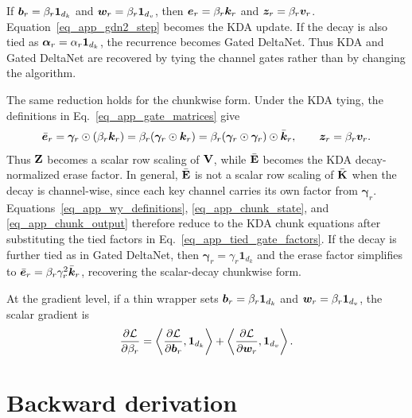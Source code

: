 If ${\bm{b}}_r=\beta_r\mathbf{1}_{d_k}$ and ${\bm{w}}_r=\beta_r\mathbf{1}_{d_v}$, then ${\bm{e}}_r=\beta_r{\bm{k}}_r$ and ${\bm{z}}_r=\beta_r{\bm{v}}_r$. Equation~\ref{eq_app_gdn2_step} becomes the KDA update. If the decay is also tied as ${\bm{\alpha}}_r=\alpha_r\mathbf{1}_{d_k}$, the recurrence becomes Gated DeltaNet. Thus KDA and Gated DeltaNet are recovered by tying the channel gates rather than by changing the algorithm.

The same reduction holds for the chunkwise form. Under the KDA tying, the definitions in Eq.~\ref{eq_app_gate_matrices} give
\begin{align}
    \bar{{\bm{e}}}_r
    =
    \boldsymbol{\gamma}_r\odot(\beta_r{\bm{k}}_r)
    =
    \beta_r(\boldsymbol{\gamma}_r\odot{\bm{k}}_r)
    =
    \beta_r(\boldsymbol{\gamma}_r\odot\boldsymbol{\gamma}_r)\odot\bar{{\bm{k}}}_r,
    \qquad
    {\bm{z}}_r
    =
    \beta_r{\bm{v}}_r .
\label{eq_app_tied_gate_factors}
\end{align}
Thus ${\mathbf{Z}}$ becomes a scalar row scaling of ${\mathbf{V}}$, while $\bar{{\mathbf{E}}}$ becomes the KDA decay-normalized erase factor. In general, $\bar{{\mathbf{E}}}$ is not a scalar row scaling of $\bar{{\mathbf{K}}}$ when the decay is channel-wise, since each key channel carries its own factor from $\boldsymbol{\gamma}_r$. Equations~\ref{eq_app_wy_definitions}, \ref{eq_app_chunk_state}, and \ref{eq_app_chunk_output} therefore reduce to the KDA chunk equations after substituting the tied factors in Eq.~\ref{eq_app_tied_gate_factors}. If the decay is further tied as in Gated DeltaNet, then $\boldsymbol{\gamma}_r=\gamma_r\mathbf{1}_{d_k}$ and the erase factor simplifies to $\bar{{\bm{e}}}_r=\beta_r\gamma_r^2\bar{{\bm{k}}}_r$, recovering the scalar-decay chunkwise form.

At the gradient level, if a thin wrapper sets ${\bm{b}}_r=\beta_r\mathbf{1}_{d_k}$ and ${\bm{w}}_r=\beta_r\mathbf{1}_{d_v}$, the scalar gradient is
\begin{align}
    \frac{\partial \mathcal{L}}{\partial \beta_r}
    =
    \left\langle
    \frac{\partial \mathcal{L}}{\partial {\bm{b}}_r},
    \mathbf{1}_{d_k}
    \right\rangle
    +
    \left\langle
    \frac{\partial \mathcal{L}}{\partial {\bm{w}}_r},
    \mathbf{1}_{d_v}
    \right\rangle .
\label{eq_app_beta_gradient}
\end{align}

\section{Backward derivation}
\label{app_backward}

